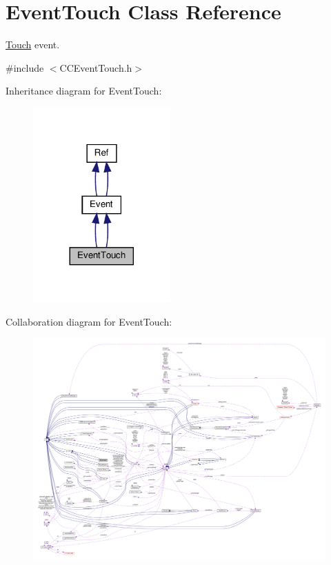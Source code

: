 \hypertarget{classEventTouch}{}\section{Event\+Touch Class Reference}
\label{classEventTouch}


\hyperlink{classTouch}{Touch} event.  




{\ttfamily \#include $<$C\+C\+Event\+Touch.\+h$>$}



Inheritance diagram for Event\+Touch\+:
\nopagebreak
\begin{figure}[H]
\begin{center}
\leavevmode
\includegraphics[width=149pt]{classEventTouch__inherit__graph}
\end{center}
\end{figure}


Collaboration diagram for Event\+Touch\+:
\nopagebreak
\begin{figure}[H]
\begin{center}
\leavevmode
\includegraphics[width=350pt]{classEventTouch__coll__graph}
\end{center}
\end{figure}
